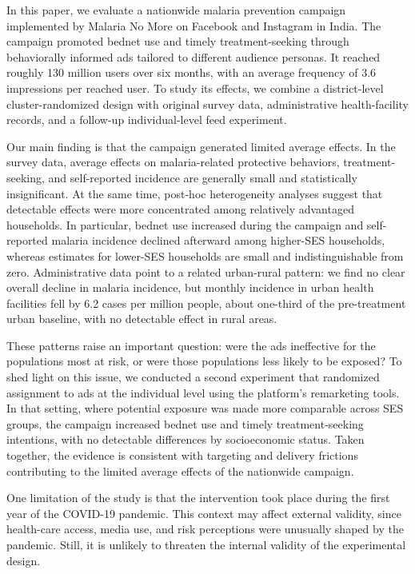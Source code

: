 In this paper, we evaluate a nationwide malaria prevention campaign implemented by Malaria No More on Facebook and Instagram in India. The campaign promoted bednet use and timely treatment-seeking through behaviorally informed ads tailored to different audience personas. It reached roughly 130 million users over six months, with an average frequency of 3.6 impressions per reached user. To study its effects, we combine a district-level cluster-randomized design with original survey data, administrative health-facility records, and a follow-up individual-level feed experiment.

Our main finding is that the campaign generated limited average effects. In the survey data, average effects on malaria-related protective behaviors, treatment-seeking, and self-reported incidence are generally small and statistically insignificant. At the same time, post-hoc heterogeneity analyses suggest that detectable effects were more concentrated among relatively advantaged households. In particular, bednet use increased during the campaign and self-reported malaria incidence declined afterward among higher-SES households, whereas estimates for lower-SES households are small and indistinguishable from zero. Administrative data point to a related urban-rural pattern: we find no clear overall decline in malaria incidence, but monthly incidence in urban health facilities fell by 6.2 cases per million people, about one-third of the pre-treatment urban baseline, with no detectable effect in rural areas.

These patterns raise an important question: were the ads ineffective for the populations most at risk, or were those populations less likely to be exposed? To shed light on this issue, we conducted a second experiment that randomized assignment to ads at the individual level using the platform's remarketing tools. In that setting, where potential exposure was made more comparable across SES groups, the campaign increased bednet use and timely treatment-seeking intentions, with no detectable differences by socioeconomic status. Taken together, the evidence is consistent with targeting and delivery frictions contributing to the limited average effects of the nationwide campaign.

One limitation of the study is that the intervention took place during the first year of the COVID-19 pandemic. This context may affect external validity, since health-care access, media use, and risk perceptions were unusually shaped by the pandemic. Still, it is unlikely to threaten the internal validity of the experimental design.

